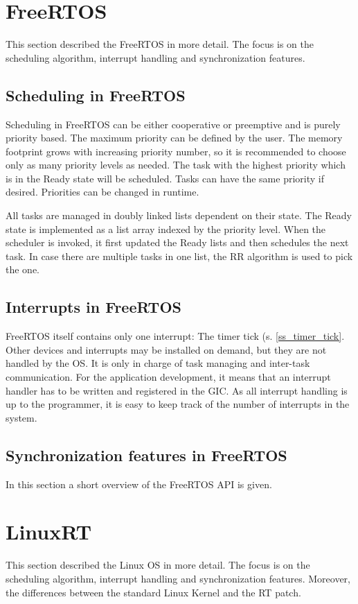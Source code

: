 \section{FreeRTOS}
This section described the FreeRTOS in more detail.
The focus is on the scheduling algorithm, interrupt handling and synchronization features.
\subsection{Scheduling in FreeRTOS}\label{ss_scheduling_in_freertos}
Scheduling in FreeRTOS \cite{freertos} can be either cooperative or preemptive and is purely priority based.
The maximum priority can be defined by the user. 
The memory footprint grows with increasing priority number, so it is recommended to choose only as many priority levels as needed.
The task with the highest priority which is in the Ready state will be scheduled. 
Tasks can have the same priority if desired.
Priorities can be changed in runtime.
\par
All tasks are managed in doubly linked lists dependent on their state. 
The Ready state is implemented as a list array indexed by the priority level. 
When the scheduler is invoked, it first updated the Ready lists and then schedules the next task.
In case there are multiple tasks in one list, the \ac{RR} algorithm is used to pick the one.
\par
[Picture Ready Queue] 

\subsection{Interrupts in FreeRTOS}\label{ss_interrupts_in_freertos}
FreeRTOS itself contains only one interrupt: The timer tick (s. \ref{ss_timer_tick}.
Other devices and interrupts may be installed on demand, but they are not handled by the OS. 
It is only in charge of task managing and inter-task communication.
For the application development, it means that an interrupt handler has to be written and registered in the \ac{GIC}.
As all interrupt handling is up to the programmer, it is easy to keep track of the number of interrupts in the system.

\subsection{Synchronization features in FreeRTOS}
In this section a short overview of the FreeRTOS \ac{API} is given.


\section{LinuxRT}
This section described the Linux \ac{OS} in more detail.
The focus is on the scheduling algorithm, interrupt handling and synchronization features.
Moreover, the differences between the standard Linux Kernel and the RT patch.

